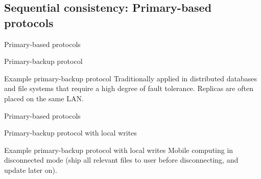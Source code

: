 \subsection{Sequential consistency: Primary-based protocols}
\begin{slide}{Primary-based protocols}
  \begin{block}{Primary-backup protocol}
    \begin{centerfig}
    \end{centerfig}
  \end{block}
  \onslide
  \begin{exampleblock}{Example primary-backup protocol}
    Traditionally applied in distributed databases and file systems that require a high degree of fault
    tolerance. Replicas are often placed on the same LAN.
  \end{exampleblock}
\end{slide}
\begin{slide}{Primary-based protocols}
  \begin{block}{Primary-backup protocol with local writes}
    \begin{centerfig}
    \end{centerfig}
  \end{block}
  \onslide
  \begin{exampleblock}{Example primary-backup protocol with local writes}
    Mobile computing in disconnected mode (ship all relevant files to user before disconnecting, and update
    later on).
  \end{exampleblock}
\end{slide}
